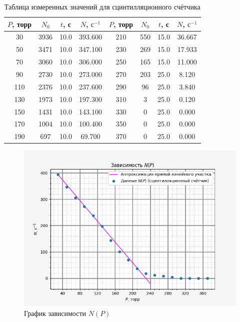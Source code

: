     \begin{table}[h!]
        \centering
        \begin{tabular}{|c|c|c|c|c|c|c|c|}
        \hline
        $P$, торр & $N_0$  & $t$, с & $N$, $\text{с}^{-1}$ & $P$, торр & $N_0$ & $t$, с & $N$, $\text{с}^{-1}$ \\ \hline
        30        & 3936 & 10.0   & 393.600                & 210       & 550 & 15.0   & 36.667                 \\ \hline
        50        & 3471 & 10.0   & 347.100                & 230       & 269 & 15.0   & 17.933                 \\ \hline
        70        & 3060 & 10.0   & 306.000                & 250       & 165 & 15.0   & 11.000                 \\ \hline
        90        & 2730 & 10.0   & 273.000                & 270       & 203 & 25.0   & 8.120                  \\ \hline
        110       & 2376 & 10.0   & 237.600                & 290       & 96  & 25.0   & 3.840                  \\ \hline
        130       & 1973 & 10.0   & 197.300                & 310       & 3   & 25.0   & 0.120                  \\ \hline
        150       & 1431 & 10.0   & 143.100                & 330       & 0   & 25.0   & 0.000                  \\ \hline
        170       & 1004 & 10.0   & 100.400                & 350       & 0   & 25.0   & 0.000                  \\ \hline
        190       & 697  & 10.0   & 69.700                 & 370       & 0   & 25.0   & 0.000                  \\ \hline
        \end{tabular}
        \caption{Таблица измеренных значений для сцинтилляционного счётчика}
    \end{table}

    \begin{figure}[h!]
        \centering
        \includegraphics[width = 14 cm]{images/method_2}
        \caption{График зависимости $N(P)$}
        \label{}
    \end{figure}


